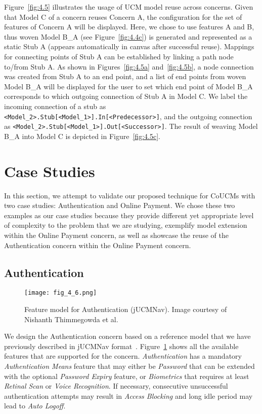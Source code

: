 Figure~\ref{fig:4.5} illustrates the usage of UCM model reuse across concerns. Given that Model C of a concern reuses Concern A, the configuration for the set of features of Concern A will be displayed. Here, we chose to use features A and B, thus woven Model B\_A (see Figure~\ref{fig:4.4c}) is generated and represented as a static Stub A (appears automatically in canvas after successful reuse). Mappings for connecting points of Stub A can be established by linking a path node to/from Stub A. As shown in Figures~\ref{fig:4.5a} and~\ref{fig:4.5b}, a node connection was created from Stub A to an end point, and a list of end points from woven Model B\_A will be displayed for the user to set which end point of Model B\_A corresponds to which outgoing connection of Stub A in Model C. We label the incoming connection of a stub as \verb|<Model_2>.Stub[<Model_1>].In[<Predecessor>]|, and the outgoing connection as \verb|<Model_2>.Stub[<Model_1>].Out[<Successor>]|. The result of weaving Model B\_A into Model C is depicted in Figure~\ref{fig:4.5c}.

\section{Case Studies} \label{sec:4.2}

In this section, we attempt to validate our proposed technique for CoUCMs with two case studies: Authentication and Online Payment. We chose these two examples as our case studies because they provide different yet appropriate level of complexity to the problem that we are studying, exemplify model extension within the Online Payment concern, as well as showcase the reuse of the Authentication concern within the Online Payment concern.

\subsection{Authentication}

\begin{figure}[h]
	\centering
	\texttt{[image: fig\_4\_6.png]}
	\caption[Feature model for Authentication (jUCMNav)]{Feature model for Authentication (jUCMNav). Image courtesy of Nishanth Thimmegowda et al.~\cite{thimmegowda2014concern}}
	\label{fig:4.6}
\end{figure}

We design the Authentication concern based on a reference model that we have previously described in jUCMNav format~\cite{thimmegowda2014concern}. Figure~\ref{fig:4.6} shows all the available features that are supported for the concern. \emph{Authentication} has a mandatory \emph{Authentication Means} feature that may either be \emph{Password} that can be extended with the optional \emph{Password Expiry} feature, or \emph{Biometrics} that requires at least \emph{Retinal Scan} or \emph{Voice Recognition}. If necessary, consecutive unsuccessful authentication attempts may result in \emph{Access Blocking} and long idle period may lead to \emph{Auto Logoff}.

